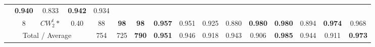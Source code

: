 \begin{table}[tph]
\begin{adjustbox}{angle=90}
{\begin{tabular}{c|c|cc|ccc|ccc|ccc|ccc}
                                                                        &
                \textbf{0.940}
                                                                        & 0.833
                                                                        &
                \textbf{0.942}
                                                                        & 0.934
                \\
                                                                        & 8
                                                                        & $CW_{2}^{t}*$                  & 0.40 & 88 &
                \textbf{98}
                                                                        &
                \textbf{98}
                                                                        &
                \textbf{0.957}
                                                                        & 0.951
                                                                        & 0.925                          &
                0.880                                                   &
                \textbf{0.980}
                                                                        &
                \textbf{0.980}
                                                                        & 0.894
                                                                        &
                \textbf{0.974}
                                                                        & 0.968
                \\
                \midrule
                \multicolumn{4}{c|}{Total / Average}                    & 754
                                                                        & 725                            &
                \textbf{790}
                                                                        &
                \textbf{0.951}
                                                                        & 0.946
                                                                        & 0.918
                                                                        & 0.943
                                                                        & 0.906
                                                                        &
                \textbf{0.985}
                                                                        & 0.944
                                                                        & 0.911
                                                                        &
                \textbf{0.973}

\end{tabular}}
\end{adjustbox}
\end{table}
